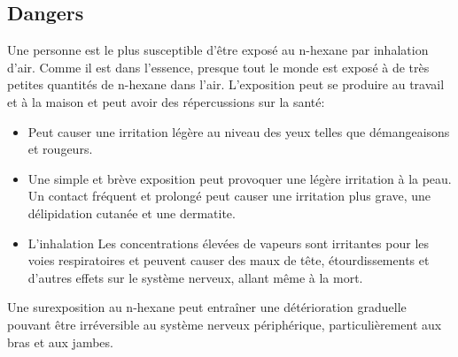 \subsection{Dangers}
Une personne est le plus susceptible d'être exposé au n-hexane par inhalation d'air. Comme il est dans l'essence, presque tout le monde est exposé à de très petites quantités de n-hexane dans l'air. L'exposition peut se produire au travail et à la maison et peut avoir des répercussions sur la santé:
\begin{itemize}

\item  Peut causer une irritation légère au niveau des yeux telles que démangeaisons et rougeurs.
\item  Une simple et brève exposition peut provoquer une légère irritation à la peau. Un contact fréquent et prolongé peut causer une irritation plus grave, une délipidation cutanée et une dermatite.
\item L'inhalation Les concentrations élevées de vapeurs sont irritantes pour les voies respiratoires et peuvent causer des maux de tête, étourdissements et  d'autres effets sur le système nerveux, allant même à la  mort. 
\end{itemize}

Une surexposition au n-hexane peut entraîner une détérioration graduelle pouvant être irréversible au système nerveux périphérique, particulièrement aux bras et aux jambes.




